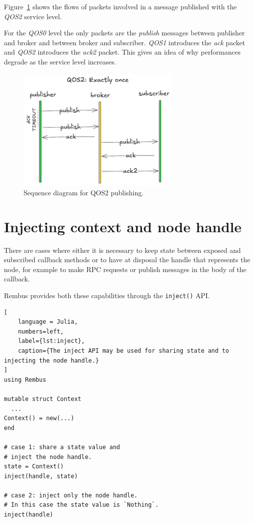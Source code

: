 \documentclass{juliacon}
\begin{document}
Figure~\ref{fig:pubsequence} shows the flows of packets involved in a message published 
with the \emph{QOS2} service level.
\vskip 6pt

For the \emph{QOS0} level the only packets are the \emph{publish} messages between publisher
and broker and between broker and subscriber. \emph{QOS1} introduces the \emph{ack} packet
and \emph{QOS2} introduces the \emph{ack2} packet. 
This gives an idea of why performances degrade as the service level increases.

\begin{figure}[t]
  \centerline{\includegraphics[width=8cm]{figures/pubsequence.png}}
  \caption{Sequence diagram for QOS2 publishing.}
      \label{fig:pubsequence}
\end{figure}
  

\section{Injecting context and node handle}\label{sec-inject}

There are cases where either it is necessary to keep state between exposed and subscribed
callback methods or to have at disposal the handle that represents the node, for example to
make RPC requests or publish messages in the body of the callback. 
\vskip 6pt

Rembus provides both these capabilities through the \texttt{inject()}
API.

\begin{lstlisting}[
    language = Julia, 
    numbers=left, 
    label={lst:inject}, 
    caption={The inject API may be used for sharing state and to injecting the node handle.}
]
using Rembus

mutable struct Context
  ...
Context() = new(...)
end

# case 1: share a state value and
# inject the node handle.
state = Context() 
inject(handle, state)

# case 2: inject only the node handle.
# In this case the state value is `Nothing`.
inject(handle)
\end{lstlisting}
\end{document}
